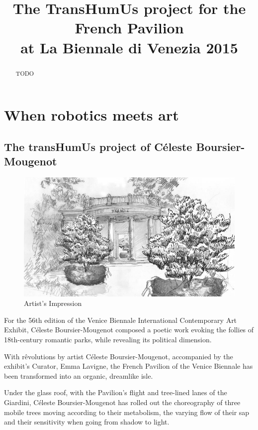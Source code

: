 \documentclass[letterpaper, 10 pt, conference]{IEEEtran}  %
\title{\LARGE \bf
    The TransHumUs project for the French Pavilion \\ at La Biennale di Venezia 2015
}
\begin{document}
\maketitle
\thispagestyle{empty}
\pagestyle{empty}


\begin{abstract}
    TODO
\end{abstract}
\section{When robotics meets art}
\subsection{The transHumUs project of Céleste Boursier-Mougenot}

\begin{figure}[thpb]
    \centering
    \includegraphics[width=\linewidth]{img/vue_artiste.jpg}
    \caption{Artist's Impression}
    \label{artists_impression}
\end{figure}

For the 56th edition of the Venice Biennale International Contemporary Art Exhibit, Céleste Boursier-Mougenot composed a poetic work evoking the follies of 18th-century romantic parks, while revealing its political dimension.

With rêvolutions by artist Céleste Boursier-Mougenot, accompanied by the exhibit’s Curator, Emma Lavigne, the French Pavilion of the Venice Biennale has been transformed into an organic, dreamlike isle.

Under the glass roof, with the Pavilion’s flight and tree-lined lanes of the Giardini, Céleste Boursier-Mougenot has rolled out the choreography of three mobile trees moving according to their metabolism, the varying flow of their sap and their sensitivity when going from shadow to light.
\end{document}
